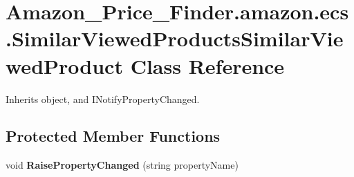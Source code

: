 \hypertarget{class_amazon___price___finder_1_1amazon_1_1ecs_1_1_similar_viewed_products_similar_viewed_product}{\section{Amazon\-\_\-\-Price\-\_\-\-Finder.\-amazon.\-ecs.\-Similar\-Viewed\-Products\-Similar\-Viewed\-Product Class Reference}
\label{class_amazon___price___finder_1_1amazon_1_1ecs_1_1_similar_viewed_products_similar_viewed_product}
}


 




Inherits object, and I\-Notify\-Property\-Changed.

\subsection*{Protected Member Functions}
\begin{DoxyCompactItemize}
\item 
\hypertarget{class_amazon___price___finder_1_1amazon_1_1ecs_1_1_similar_viewed_products_similar_viewed_product_a9bd83a802d914c08b570d18a68866a29}{void {\bfseries Raise\-Property\-Changed} (string property\-Name)}\label{class_amazon___price___finder_1_1amazon_1_1ecs_1_1_similar_viewed_products_similar_viewed_product_a9bd83a802d914c08b570d18a68866a29}

\end{DoxyCompactItemize}

